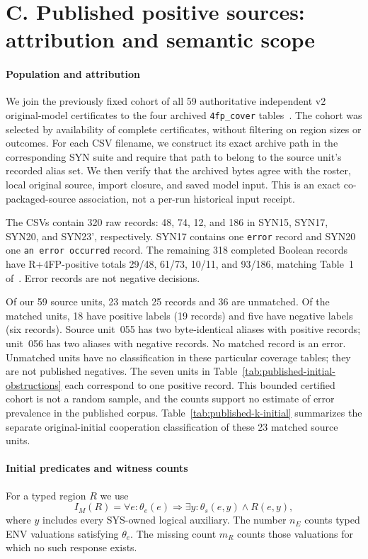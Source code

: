 \documentclass[11pt]{article}
\begin{document}
\section*{C. Published positive sources: attribution and semantic scope}
\setcounter{subsection}{0}
\renewcommand{\thesubsection}{C.\arabic{subsection}}
\label{supp:published-positive-sources}

\paragraph{Population and attribution}
We join the previously fixed cohort of all 59 authoritative independent
v2 original-model certificates to the four archived \texttt{4fp\_cover}
tables~\cite{kindartifact}. The cohort was selected by availability of complete certificates,
without filtering on region sizes or outcomes. For each CSV filename, we
construct its exact archive path in the corresponding SYN suite and
require that path to belong to the source unit's recorded alias set.
We then verify that the archived bytes agree with the roster, local
original source, import closure, and saved model input. This is an exact
co-packaged-source association, not a per-run historical input receipt.

The CSVs contain 320 raw records: 48, 74, 12, and 186 in SYN15, SYN17,
SYN20, and SYN23', respectively. SYN17 contains one \texttt{error} record
and SYN20 one \texttt{an error occurred} record. The remaining 318 completed
Boolean records have R+4FP-positive totals 29/48, 61/73, 10/11, and 93/186,
matching Table~1 of~\cite{kind}. Error records are not negative decisions.

Of our 59 source units, 23 match 25 records and 36 are unmatched. Of the
matched units, 18 have positive labels (19 records) and five have negative
labels (six records). Source unit~055 has two byte-identical aliases with
positive records; unit~056 has two aliases with negative records. No
matched record is an error. Unmatched units have no classification in
these particular coverage tables; they are not published negatives.
The seven units in Table~\ref{tab:published-initial-obstructions} each correspond to one positive
record. This bounded certified cohort is not a random sample, and the
counts support no estimate of error prevalence in the published corpus.
Table~\ref{tab:published-k-initial} summarizes the separate original-initial
cooperation classification of these 23 matched source units.


\paragraph{Initial predicates and witness counts}
For a typed region $R$ we use
\[
 I_M(R)=\forall e:\theta_e(e)\Rightarrow
          \exists y:\theta_s(e,y)\land R(e,y),
\]
where $y$ includes every SYS-owned logical auxiliary. The number $n_E$
counts typed ENV valuations satisfying $\theta_e$. The missing count
$m_R$ counts those valuations for which no such response exists. 
\end{document}
